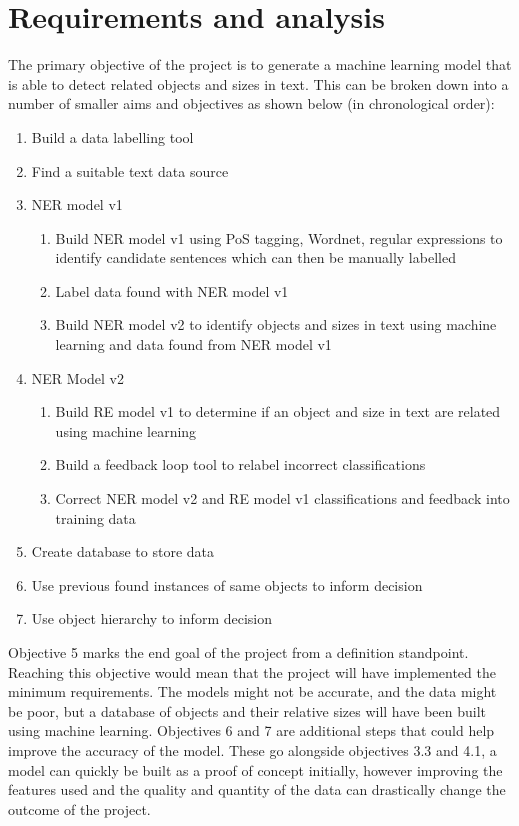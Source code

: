 \documentclass[11pt,oneside]{book}
\begin{document}
\chapter{Requirements and analysis}

The primary objective of the project is to generate a machine learning model that is able to detect related objects and sizes in text. This can be broken down into a number of smaller aims and objectives as shown below (in chronological order):

\begin{enumerate}
\item Build a data labelling tool
\item Find a suitable text data source
\item NER model v1
\begin{enumerate}
\item Build NER model v1 using PoS tagging, Wordnet, regular expressions to identify candidate sentences which can then be manually labelled
\item Label data found with NER model v1
\item Build NER model v2 to identify objects and sizes in text using machine learning and data found from NER model v1
\end{enumerate}
\item NER Model v2
\begin{enumerate}
\item Build RE model v1 to determine if an object and size in text are related using machine learning
\item Build a feedback loop tool to relabel incorrect classifications
\item Correct NER model v2 and RE model v1 classifications and feedback into training data
\end{enumerate}
\item Create database to store data
\item Use previous found instances of same objects to inform decision
\item Use object hierarchy to inform decision
\end{enumerate}

Objective 5 marks the end goal of the project from a definition standpoint. Reaching this objective would mean that the project will have implemented the minimum requirements. The models might not be accurate, and the data might be poor, but a database of objects and their relative sizes will have been built using machine learning. Objectives 6 and 7 are additional steps that could help improve the accuracy of the model. These go alongside objectives 3.3 and 4.1, a model can quickly be built as a proof of concept initially, however improving the features used and the quality and quantity of the data can drastically change the outcome of the project.
\end{document}

